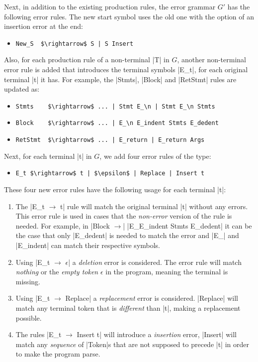 Next, in addition to the existing production rules, the error grammar $G'$ has
the following error rules. The new start symbol uses the old one with the option
of an insertion error at the end:
\begin{itemize}
  \item \lstinline{New_S  $\rightarrow$ S | S Insert}
\end{itemize}
Also, for each production rule of a non-terminal |T| in $G$, another
non-terminal error rule is added that introduces the terminal symbols |E_t|, for
each original terminal |t| it has. For example, the |Stmts|, |Block| and
|RetStmt| rules are updated as:
\begin{itemize}
  \item \lstinline{Stmts    $\rightarrow$ ... | Stmt E_\n | Stmt E_\n Stmts}
  \item \lstinline{Block    $\rightarrow$ ... | E_\n E_indent Stmts E_dedent}
  \item \lstinline{RetStmt  $\rightarrow$ ... | E_return | E_return Args}
\end{itemize}
Next, for each terminal |t| in $G$, we add four error rules of the type:
\begin{itemize}
  \item \lstinline{E_t $\rightarrow$ t | $\epsilon$ | Replace | Insert t}
\end{itemize}
These four new error rules have the following usage for each terminal |t|:
\begin{enumerate}
  \item The |E_t $\rightarrow$ t| rule will match the original terminal |t|
  without any errors. This error rule is used in cases that the \emph{non-error}
  version of the rule is needed. For example, in |Block $\rightarrow$| \break
  |E_\n E_indent Stmts E_dedent| it can be the case that only
  |E_dedent| is needed to match the error and |E_\n| and |E_indent| can match
  their respective symbols.
  \item Using |E_t $\rightarrow$ $\epsilon$| a \emph{deletion} error is considered. The
  error rule will match \emph{nothing} or the \emph{empty token} $\epsilon$ in
  the program, meaning the terminal is missing.
  \item Using |E_t $\rightarrow$ Replace| a \emph{replacement} error is considered.
  |Replace| will match any terminal token that is \emph{different} than |t|,
  making a replacement possible.
  \item  The rules |E_t $\rightarrow$ Insert t| will introduce a \emph{insertion} error,
  \ie |Insert| will match any \emph{sequence} of |Token|s that are not supposed
  to precede |t| in order to make the program parse.
\end{enumerate}
